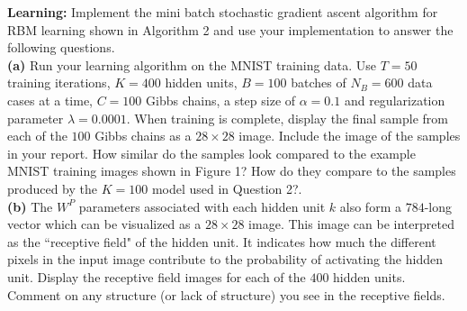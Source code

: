\documentclass[11pt]{article}
\begin{document}
\begin{problem}{30} \textbf{Learning:} Implement the mini batch stochastic gradient ascent algorithm for RBM learning shown in Algorithm 2 and use your implementation to answer the following questions.\\

\textbf{(a)} Run your learning algorithm on the MNIST training data. Use $T=50$ training iterations, $K=400$ hidden units, $B=100$ batches of $N_B=600$ data cases at a time, $C=100$ Gibbs chains, a step size of $\alpha=0.1$ and regularization parameter $\lambda=0.0001$. When training is complete, display the final sample from each of the $100$ Gibbs chains as a $28\times 28$ image. Include the image of the samples in your report. How similar do the samples look compared to the example MNIST training images shown in Figure 1? How do they compare to the samples produced by the $K=100$ model used in Question 2?.\\

\textbf{(b)} The $W^P$ parameters associated with each hidden unit $k$ also form a $784$-long vector which can be visualized as a $28 \times 28$ image. This image can be interpreted as the ``receptive field" of the hidden unit. It indicates how much the different pixels in the input image contribute to the probability of activating the hidden unit. Display the receptive field images for each of the $400$ hidden units. Comment on any structure (or lack of structure) you see in the receptive fields.
\end{problem}
\end{document}
